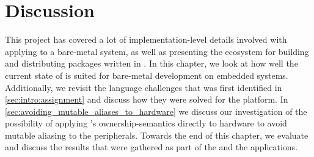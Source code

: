 
\chapter{Discussion}
\label{chap:discussion}

This project has covered a lot of implementation-level details involved with applying {\rust} to a bare-metal system, as well as presenting the ecosystem for building and distributing packages written in {\rust}.
In this chapter, we look at how well the current state of {\rust} is suited for bare-metal development on embedded systems.
Additionally, we revisit the language challenges that was first identified in \autoref{sec:intro:assignment} and discuss how they were solved for the {\rg} platform.
In \autoref{sec:avoiding_mutable_aliases_to_hardware} we discuss our investigation of the possibility of applying {\rust}'s ownership-semantics directly to hardware to avoid mutable aliasing to the peripherals.
Towards the end of this chapter, we evaluate and discuss the results that were gathered as part of the {\tracker} and the {\cg} applications.




